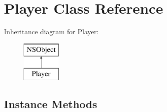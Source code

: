 \hypertarget{interface_player}{\section{Player Class Reference}
\label{interface_player}
}
Inheritance diagram for Player\+:\begin{figure}[H]
\begin{center}
\leavevmode
\includegraphics[height=2.000000cm]{interface_player}
\end{center}
\end{figure}
\subsection*{Instance Methods}
